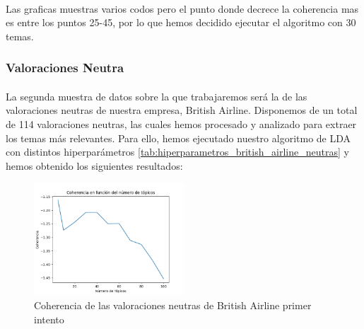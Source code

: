 \documentclass{report}
\begin{document}
{{                    \paragraph*{}{
                        Las graficas muestras varios codos pero el punto donde decrece la coherencia mas es entre los puntos 25-45, por lo que hemos decidido ejecutar el algoritmo con 30 temas.
                    }
                \clearpage\subsubsection*{Valoraciones Neutra}
                    \paragraph*{}{
                        La segunda muestra de datos sobre la que trabajaremos será la de las valoraciones neutras de nuestra empresa, British Airline.
                        Disponemos de un total de 114 valoraciones neutras, las cuales hemos procesado y analizado para extraer los temas más relevantes.
                        Para ello, hemos ejecutado nuestro algoritmo de LDA con distintos hiperparámetros \ref{tab:hiperparametros_british_airline_neutras} y hemos obtenido los siguientes resultados:
                    }
                    \begin{figure}[H]
                        \centering
                        \includegraphics[width=0.5\textwidth]{./img/british_airline_neutras1.png}
                        \caption{Coherencia de las valoraciones neutras de British Airline primer intento}
                    \end{figure}
}}
\end{document}
